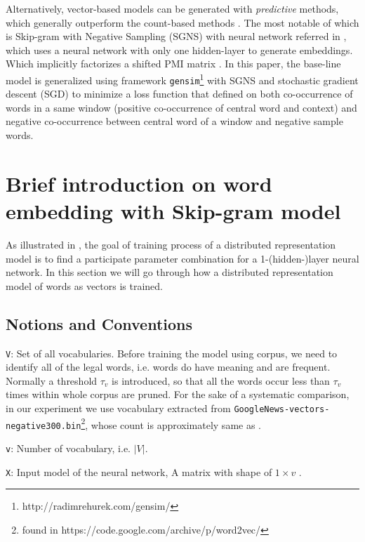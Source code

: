 \documentclass[11pt,a4paper]{article}
\begin{document}
Alternatively, vector-based models can be generated with \emph{predictive} methods, which generally outperform the count-based methods \cite{levy2015improving}. The most notable of which is Skip-gram with Negative Sampling (SGNS) with neural network referred in \cite{mikolov2013distributed}, which uses a neural network with only one hidden-layer to generate embeddings. Which implicitly factorizes a shifted PMI matrix \cite{levy2014neural}. In this paper, the base-line model is generalized using framework \verb|gensim|\footnote{http://radimrehurek.com/gensim/} with SGNS and stochastic gradient descent (SGD) to minimize a loss function that defined on both co-occurrence of words in a same window (positive co-occurrence of central word and context) and negative co-occurrence between central word of a window and negative sample words. 

\section{Brief introduction on word embedding with Skip-gram model}
As illustrated in \cite{mikolov2013distributed}, the goal of training process of a distributed representation model is to find a participate parameter combination for a 1-(hidden-)layer neural network. In this section we will go through how a distributed representation model of words as vectors is trained.

  \subsection{Notions and Conventions}
  \verb|V|: Set of all vocabularies. Before training the model using corpus, we need to identify all of the legal words, i.e. words do have meaning and are frequent. Normally a threshold $\tau_v$ is introduced, so that all the words occur less than $\tau_v$ times within whole corpus are pruned. For the sake of a systematic comparison, in our experiment we use vocabulary extracted from \verb|GoogleNews-vectors-negative300.bin|\footnote{found in https://code.google.com/archive/p/word2vec/}, whose count is approximately same as \cite{levy2015improving}.

  \verb|v|: Number of vocabulary, i.e. $|V|$.

  \verb|X|: Input model of the neural network, A matrix with shape of $1 \times v$ .
\end{document}
